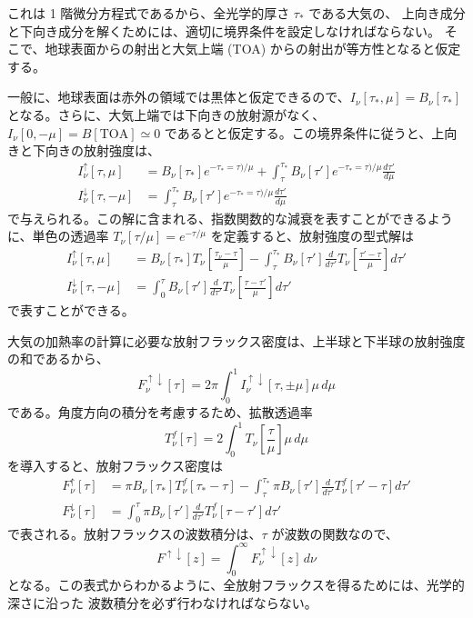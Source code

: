 \documentclass[article,twoside]{dennou777}
\begin{document}
これは 1 階微分方程式であるから、全光学的厚さ $\tau_*$ である大気の、
上向き成分と下向き成分を解くためには、適切に境界条件を設定しなければならない。
そこで、地球表面からの射出と大気上端 (TOA) からの射出が等方性となると仮定する。

一般に、地球表面は赤外の領域では黒体と仮定できるので、$I_\nu[\tau_*,\mu]=B_\nu[\tau_*]$
となる。さらに、大気上端では下向きの放射源がなく、 $I_\nu[0,-\mu]=B[\mathrm{TOA}]\simeq0$
であるとと仮定する。この境界条件に従うと、上向きと下向きの放射強度は、
\begin{align}
	I^\uparrow_\nu[\tau,\mu]
		&=B_\nu[\tau_*]e^{-\tau_*=\tau)/\mu}
		+\int^{\tau_*}_\tau B_\nu[\tau']e^{-\tau_*=\tau)/\mu}\frac{d\tau'}{d\mu}\\
	I^\downarrow_\nu[\tau,-\mu]
		&=\int^{\tau_*}_\tau B_\nu[\tau']e^{-\tau_*=\tau)/\mu}\frac{d\tau'}{d\mu}
\end{align}
で与えられる。この解に含まれる、指数関数的な減衰を表すことができるように、単色の透過率
$T_\nu[\tau/\mu]=e^{-\tau/\mu}$ を定義すると、放射強度の型式解は
\begin{align}
	I^\uparrow_\nu[\tau,\mu]
		&=B_\nu[\tau_*]T_\nu\left[\frac{\tau_\nu-\tau}{\mu}\right]
		-\int^{\tau_*}_\tau B_\nu[\tau']\frac{d}{d\tau'}T_\nu\left[\frac{\tau'-\tau}{\mu}\right]d\tau'\\
	I^\downarrow_\nu[\tau,-\mu]
		&=\int^\tau_0 B_\nu[\tau']\frac{d}{d\tau'}T_\nu\left[\frac{\tau-\tau'}{\mu}\right]d\tau'
\end{align}
で表すことができる。

大気の加熱率の計算に必要な放射フラックス密度は、上半球と下半球の放射強度の和であるから、
\begin{equation}
	F^{\uparrow\downarrow}_\nu[\tau]=2\pi\int^1_0 I^{\uparrow\downarrow}_\nu[\tau,\pm\mu]\mu\,d\mu
\end{equation}
である。角度方向の積分を考慮するため、拡散透過率
\begin{equation}
	T^f_\nu[\tau]=2\int^1_0 T_\nu\left[\frac{\tau}{\mu}\right]\mu\,d\mu
\end{equation}
を導入すると、放射フラックス密度は
\begin{align}
	F^\uparrow_\nu[\tau]
		&=\pi B_\nu[\tau_*]T^f_\nu[\tau_*-\tau]
		-\int^{\tau_*}_\tau \pi B_\nu[\tau']\frac{d}{d\tau'}T^f_\nu[\tau'-\tau]d\tau'\\
	F^\downarrow_\nu[\tau]
		&=\int^\tau_0 \pi B_\nu[\tau']\frac{d}{d\tau'}T^f_\nu[\tau-\tau']d\tau'
\end{align}
で表される。放射フラックスの波数積分は、$\tau$ が波数の関数なので、
\begin{equation}
	F^{\uparrow\downarrow}[z]=\int^\infty_0 F^{\uparrow\downarrow}_\nu[z]\,d\nu
\end{equation}
となる。この表式からわかるように、全放射フラックスを得るためには、光学的深さに沿った
波数積分を必ず行わなければならない。
\end{document}
